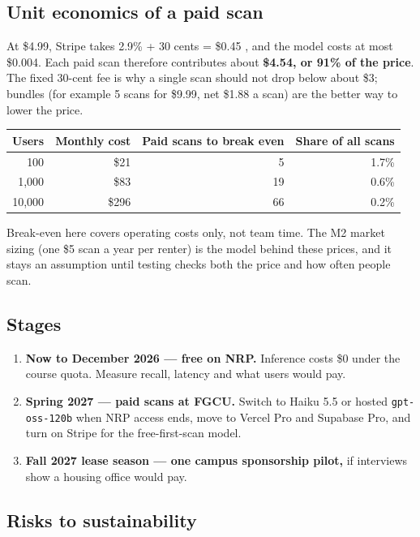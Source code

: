 \documentclass[11pt,letterpaper]{article}
\newcommand{\code}[1]{\texttt{#1}}
\begin{document}
\subsection{Unit economics of a paid scan}

At \$4.99, Stripe takes 2.9\% + 30 cents = \$0.45 \cite{stripe}, and the model costs at most \$0.004. Each paid scan therefore contributes about \textbf{\$4.54, or 91\% of the price}. The fixed 30-cent fee is why a single scan should not drop below about \$3; bundles (for example 5 scans for \$9.99, net \$1.88 a scan) are the better way to lower the price.

\begin{table}[htbp]
\centering
\small
\begin{tabular}{@{}rrrr@{}}
\toprule
\textbf{Users} & \textbf{Monthly cost} & \textbf{Paid scans to break even} & \textbf{Share of all scans} \\
\midrule
100 & \$21 & 5 & 1.7\% \\
1,000 & \$83 & 19 & 0.6\% \\
10,000 & \$296 & 66 & 0.2\% \\
\bottomrule
\end{tabular}
\end{table}

Break-even here covers operating costs only, not team time. The M2 market sizing (one \$5 scan a year per renter) is the model behind these prices, and it stays an assumption until testing checks both the price and how often people scan.

\subsection{Stages}

\begin{enumerate}
  \item \textbf{Now to December 2026 --- free on NRP.} Inference costs \$0 under the course quota. Measure recall, latency and what users would pay.
  \item \textbf{Spring 2027 --- paid scans at FGCU.} Switch to Haiku 5.5 or hosted \code{gpt-oss-120b} when NRP access ends, move to Vercel Pro and Supabase Pro, and turn on Stripe for the free-first-scan model.
  \item \textbf{Fall 2027 lease season --- one campus sponsorship pilot,} if interviews show a housing office would pay.
\end{enumerate}

\subsection{Risks to sustainability}
\end{document}
